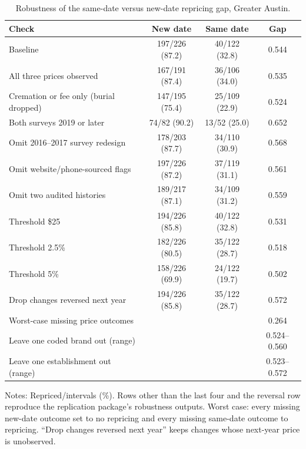 \begin{table}[H]\centering\footnotesize
\caption{Robustness of the same-date versus new-date repricing gap, Greater Austin.}\label{tab:A3}
\begin{tabular*}{\textwidth}{@{\extracolsep{\fill}}p{6.2cm}ccc@{}}\toprule
Check & New date & Same date & Gap \\\midrule
Baseline & 197/226 (87.2) & 40/122 (32.8) & 0.544 \\
All three prices observed & 167/191 (87.4) & 36/106 (34.0) & 0.535 \\
Cremation or fee only (burial dropped) & 147/195 (75.4) & 25/109 (22.9) & 0.524 \\
Both surveys 2019 or later & 74/82 (90.2) & 13/52 (25.0) & 0.652 \\
Omit 2016--2017 survey redesign & 178/203 (87.7) & 34/110 (30.9) & 0.568 \\
Omit website/phone-sourced flags & 197/226 (87.2) & 37/119 (31.1) & 0.561 \\
Omit two audited histories & 189/217 (87.1) & 34/109 (31.2) & 0.559 \\
Threshold \$25 & 194/226 (85.8) & 40/122 (32.8) & 0.531 \\
Threshold 2.5\% & 182/226 (80.5) & 35/122 (28.7) & 0.518 \\
Threshold 5\% & 158/226 (69.9) & 24/122 (19.7) & 0.502 \\
Drop changes reversed next year & 194/226 (85.8) & 35/122 (28.7) & 0.572 \\
Worst-case missing price outcomes & & & 0.264 \\
Leave one coded brand out (range) & & & 0.524--0.560 \\
Leave one establishment out (range) & & & 0.523--0.572 \\
\bottomrule\end{tabular*}
\begin{minipage}{\textwidth}\vspace{3pt}\scriptsize Notes: Repriced/intervals (\%). Rows other than the last four and the reversal row reproduce the replication package's robustness outputs. Worst case: every missing new-date outcome set to no repricing and every missing same-date outcome to repricing. ``Drop changes reversed next year'' keeps changes whose next-year price is unobserved.\end{minipage}
\end{table}
